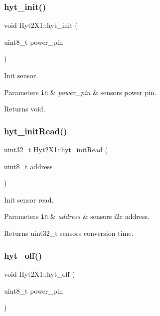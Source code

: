 \subsubsection{\texorpdfstring{hyt\+\_\+init()}{hyt\_init()}}
{\footnotesize\ttfamily void Hyt2\+X1\+::hyt\+\_\+init (\begin{DoxyParamCaption}\item[{uint8\+\_\+t}]{power\+\_\+pin }\end{DoxyParamCaption})}



Init sensor. 


\begin{DoxyParams}[1]{Parameters}
\mbox{\tt in}  & {\em power\+\_\+pin} & sensors power pin. \\
\hline
\end{DoxyParams}
\begin{DoxyReturn}{Returns}
void. 
\end{DoxyReturn}
\mbox{\label{namespaceHyt2X1_a240a988351da007adac832e7ffb851c9}} 
\subsubsection{\texorpdfstring{hyt\+\_\+init\+Read()}{hyt\_initRead()}}
{\footnotesize\ttfamily uint32\+\_\+t Hyt2\+X1\+::hyt\+\_\+init\+Read (\begin{DoxyParamCaption}\item[{uint8\+\_\+t}]{address }\end{DoxyParamCaption})}



Init sensor read. 


\begin{DoxyParams}[1]{Parameters}
\mbox{\tt in}  & {\em address} & sensors i2c address. \\
\hline
\end{DoxyParams}
\begin{DoxyReturn}{Returns}
uint32\+\_\+t sensors conversion time. 
\end{DoxyReturn}
\mbox{\label{namespaceHyt2X1_a950d46e4e993f893d99139d0443d7ca3}} 
\subsubsection{\texorpdfstring{hyt\+\_\+off()}{hyt\_off()}}
{\footnotesize\ttfamily void Hyt2\+X1\+::hyt\+\_\+off (\begin{DoxyParamCaption}\item[{uint8\+\_\+t}]{power\+\_\+pin }\end{DoxyParamCaption})}



